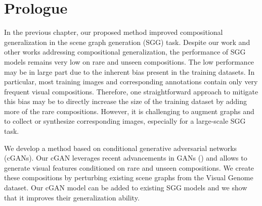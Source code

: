 \section*{Prologue}


\vspace{5pt}
In the previous chapter, our proposed method improved compositional generalization in the scene graph generation (SGG) task. %
Despite our work and other works addressing compositional generalization, the performance of SGG models remains very low on rare and unseen compositions. The low performance may be in large part due to the inherent bias present in the training datasets. In particular, most training images and corresponding annotations contain only very frequent visual compositions. Therefore, one straightforward approach to mitigate this bias may be to directly increase the size of the training dataset by adding more of the rare compositions. However, it is challenging to augment graphs and to collect or synthesize corresponding images, especially for a large-scale SGG task.

We develop a method based on conditional generative adversarial networks (cGANs). Our cGAN leverages recent advancements in GANs (\eg \citep{SPADE}) and allows to generate visual features conditioned on rare and unseen compositions. We create these compositions by perturbing existing scene graphs from the Visual Genome dataset. Our cGAN model can be added to existing SGG models and we show that it improves their generalization ability.


